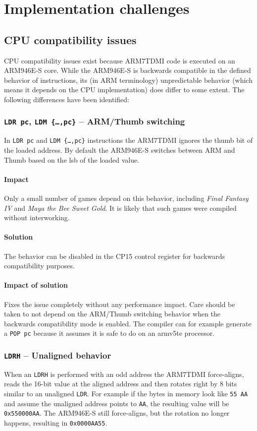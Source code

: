 \documentclass[a4paper,10pt]{report}
\begin{document}
\chapter{Implementation challenges}
\section{CPU compatibility issues}
	CPU compatibility issues exist because ARM7TDMI code is executed on an ARM946E-S core. While the ARM946E-S is backwards compatible in the defined behavior of instructions, its (in ARM terminology) unpredictable behavior (which means it depends on the CPU implementation) does differ to some extent. The following differences have been identified:
	\subsection{\texttt{LDR pc}, \texttt{LDM \{\dots,pc\}} \--- ARM/Thumb switching}
	In \texttt{LDR pc} and \texttt{LDM \{\dots,pc\}} instructions the ARM7TDMI ignores the thumb bit of the loaded address. By default the ARM946E-S switches between ARM and Thumb based on the lsb of the loaded value.
	
	\subsubsection{Impact}
	Only a small number of games depend on this behavior, including \textit{Final Fantasy IV} and \textit{Maya the Bee Sweet Gold}. It is likely that such games were compiled without interworking.
	
	\subsubsection{Solution}
	The behavior can be disabled in the CP15 control register for backwards compatibility purposes.
	
	\subsubsection{Impact of solution}
	Fixes the issue completely without any performance impact. Care should be taken to not depend on the ARM/Thumb switching behavior when the backwards compatibility mode is enabled. The compiler can for example generate a \texttt{POP pc} because it assumes it is safe to do on an armv5te processor.
	
	\subsection{\texttt{LDRH} \--- Unaligned behavior}
	When an \texttt{LDRH} is performed with an odd address the ARM7TDMI force-aligns, reads the 16-bit value at the aligned address and then rotates right by 8 bits similar to an unaligned \texttt{LDR}. For example if the bytes in memory look like \texttt{55 AA} and assume the unaligned address points to \texttt{AA}, the resulting value will be \texttt{0x550000AA}. The ARM946E-S still force-aligns, but the rotation no longer happens, resulting in \texttt{0x0000AA55}.
	
\end{document}

